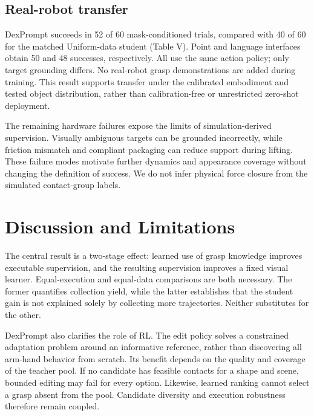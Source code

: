 \documentclass[letterpaper,10pt,conference]{ieeeconf}
\begin{document}
\subsection{Real-robot transfer}
\begin{table}[t]
\centering
\caption{HYPOTHETICAL RESULTS. Real-robot full-task success counts. All numbers in this table are imagined outcomes; no corresponding hardware trials have been performed for this draft.}
\label{tab:5}
\end{table}
DexPrompt succeeds in 52 of 60 mask-conditioned trials, compared with 40 of 60 for the matched Uniform-data student (Table V). Point and language interfaces obtain 50 and 48 successes, respectively. All use the same action policy; only target grounding differs. No real-robot grasp demonstrations are added during training. This result supports transfer under the calibrated embodiment and tested object distribution, rather than calibration-free or unrestricted zero-shot deployment.

The remaining hardware failures expose the limits of simulation-derived supervision. Visually ambiguous targets can be grounded incorrectly, while friction mismatch and compliant packaging can reduce support during lifting. These failure modes motivate further dynamics and appearance coverage without changing the definition of success. We do not infer physical force closure from the simulated contact-group labels.

\section{Discussion and Limitations}
The central result is a two-stage effect: learned use of grasp knowledge improves executable supervision, and the resulting supervision improves a fixed visual learner. Equal-execution and equal-data comparisons are both necessary. The former quantifies collection yield, while the latter establishes that the student gain is not explained solely by collecting more trajectories. Neither substitutes for the other.

DexPrompt also clarifies the role of RL. The edit policy solves a constrained adaptation problem around an informative reference, rather than discovering all arm-hand behavior from scratch. Its benefit depends on the quality and coverage of the teacher pool. If no candidate has feasible contacts for a shape and scene, bounded editing may fail for every option. Likewise, learned ranking cannot select a grasp absent from the pool. Candidate diversity and execution robustness therefore remain coupled.
\end{document}
